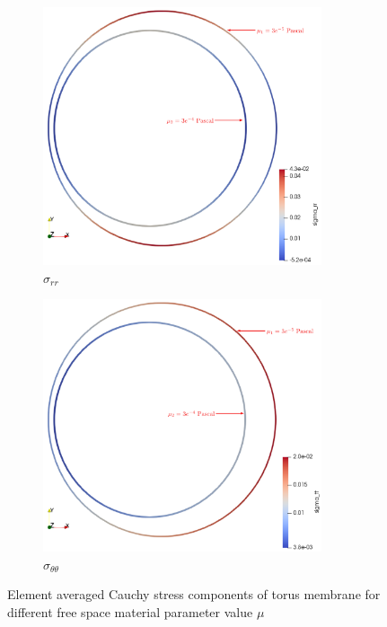 \documentclass[11pt,a4paper,final]{article}
\begin{document}
\begin{figure}[ht!]
\centering 
\begin{subfigure}[b]{0.49\textwidth}
\centering
\includegraphics[width=0.9\textwidth]{torus_avg_sigma_rr.png}
\caption{$\sigma_{rr}$}
\label{fig:1.13.1}
\end{subfigure}
\begin{subfigure}[b]{0.49\textwidth}
\centering
\includegraphics[width=0.9\textwidth]{torus_avg_sigma_theta.png}
\caption{$\sigma_{\theta \theta}$}
\label{fig:1.13.2}
\end{subfigure}
\caption{Element averaged Cauchy stress components of torus membrane for different free space material parameter value $\mu$}
\label{fig:1.13}
\end{figure}

\newpage
\printbibliography
\end{document}
